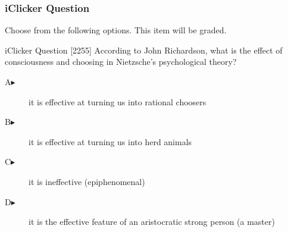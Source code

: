 \begin{frame}
  \frametitle{iClicker Question}
Choose from the following options. This item will be graded.
\begin{block}{iClicker Question}
[2255] According to John Richardson, what is the effect of
consciousness and choosing in Nietzsche's psychological theory?
\end{block}
\begin{description}
\item[A\hspace{.2in}$\blacktriangleright$] it is effective at turning us into rational choosers
\item[B\hspace{.2in}$\blacktriangleright$] it is effective at turning us into herd animals
\item[C\hspace{.2in}$\blacktriangleright$] it is ineffective (epiphenomenal)
\item[D\hspace{.2in}$\blacktriangleright$] it is the effective feature of an aristocratic strong person (a master)
\end{description}
\end{frame}